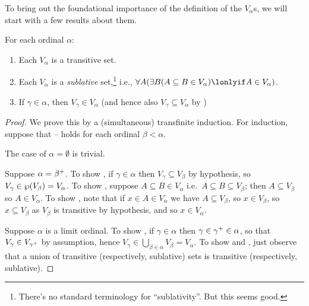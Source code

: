 \documentclass[../../../include/open-logic-section]{subfiles}
\begin{document}

To bring out the foundational importance of the definition of the
$V_\alpha$s, we will start with a few results about them.

\begin{lem}
For each ordinal $\alpha$:
\begin{enumerate}
	\item{} Each $V_\alpha$ is a transitive set.
	\item{} Each $V_\alpha$ is a
	\emph{sublative} set,\footnote{There's no standard terminology for
	``sublativity''. But this seems good.} i.e., $\forall A(\exists
	B(A \subseteq B \in V_\alpha) \lonlyif A \in V_\alpha)$.
	\item{} If $\gamma \in \alpha$, then $V_\gamma
	\in V_\alpha$ (and hence also $V_\gamma \subseteq V_\alpha$ by
	)
\end{enumerate}
\end{lem}

\begin{proof}
We prove this by a (simultaneous) transfinite induction.  For
induction, suppose that -- holds
for each ordinal $\beta < \alpha$. 

The case of $\alpha = \emptyset$ is trivial. 

Suppose $\alpha = \beta^{+}$. To show , if
$\gamma \in \alpha$ then $V_\gamma \subseteq V_\beta$ by hypothesis,
so $V_\gamma \in \wp(V_\beta) = V_\alpha$. To show
, suppose $A \subseteq B \in V_\alpha$ i.e.\ $A
\subseteq B \subseteq V_\beta$; then $A \subseteq V_\beta$ so $A \in
V_\alpha$. To show , note that if $x \in A \in
V_\alpha$ we have $A \subseteq V_\beta$, so $x \in V_\beta$, so $x
\subseteq V_\beta$ as $V_\beta$ is transitive by hypothesis, and so $x
\in V_\alpha$. 

Suppose $\alpha$ is  a limit ordinal. To show , if
$\gamma \in \alpha$ then $\gamma \in \gamma^{+} \in \alpha$, so
that $V_\gamma \in V_{\gamma^{+}}$ by assumption, hence
$V_\gamma \in \bigcup_{\beta \in \alpha} V_\beta = V_\alpha$. To show
 and , just observe that a
union of transitive (respectively, sublative) sets is transitive
(respectively, sublative). 
\end{proof}
\end{document}
